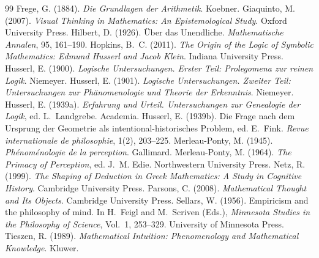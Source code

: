 \documentclass{situationist-preprint}
\begin{document}
\begin{thebibliography}{99}\small
{} Frege, G. (1884). \emph{Die Grundlagen der Arithmetik}. Koebner.
 Giaquinto, M. (2007). \emph{Visual Thinking in Mathematics: An Epistemological Study}. Oxford University Press.
 Hilbert, D. (1926). Über das Unendliche. \emph{Mathematische Annalen}, 95, 161--190.
 Hopkins, B.~C. (2011). \emph{The Origin of the Logic of Symbolic Mathematics: Edmund Husserl and Jacob Klein}. Indiana University Press.
 Husserl, E. (1900). \emph{Logische Untersuchungen. Erster Teil: Prolegomena zur reinen Logik}. Niemeyer.
 Husserl, E. (1901). \emph{Logische Untersuchungen. Zweiter Teil: Untersuchungen zur Phänomenologie und Theorie der Erkenntnis}. Niemeyer.
 Husserl, E. (1939a). \emph{Erfahrung und Urteil. Untersuchungen zur Genealogie der Logik}, ed. L.~Landgrebe. Academia.
 Husserl, E. (1939b). Die Frage nach dem Ursprung der Geometrie als intentional-historisches Problem, ed. E.~Fink. \emph{Revue internationale de philosophie}, 1(2), 203--225.
 Merleau-Ponty, M. (1945). \emph{Phénoménologie de la perception}. Gallimard.
 Merleau-Ponty, M. (1964). \emph{The Primacy of Perception}, ed. J.~M. Edie. Northwestern University Press.
 Netz, R. (1999). \emph{The Shaping of Deduction in Greek Mathematics: A Study in Cognitive History}. Cambridge University Press.
 Parsons, C. (2008). \emph{Mathematical Thought and Its Objects}. Cambridge University Press.
 Sellars, W. (1956). Empiricism and the philosophy of mind. In H.~Feigl and M.~Scriven (Eds.), \emph{Minnesota Studies in the Philosophy of Science}, Vol.~1, 253--329. University of Minnesota Press.
 Tieszen, R. (1989). \emph{Mathematical Intuition: Phenomenology and Mathematical Knowledge}. Kluwer.
\end{thebibliography}
\end{document}
